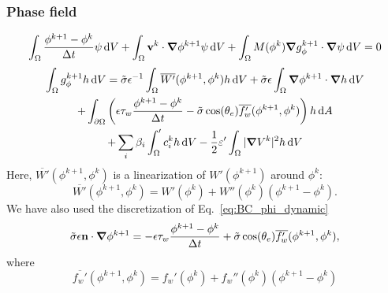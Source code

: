 \documentclass[preprint,pre,superscriptaddress,a4paper]{revtex4-1}
\renewcommand{\v}[1]{\ensuremath{\mathbf{#1}}} %
\newcommand{\gv}[1]{\ensuremath{\mbox{\boldmath$ #1 $}}}
\newcommand{\diff}{\mathrm{d}}
\newcommand{\grad}[1]{\gv{\nabla} #1} %
\begin{document}
\subsubsection{Phase field}
\begin{equation}
  \int_\Omega \frac{\phi^{k+1}-\phi^k}{\Delta t} \psi \, \diff V + \int_\Omega \v v^k \cdot \grad \phi^{k+1} \psi \, \diff V + \int_\Omega M(\phi^k) \grad g_\phi^{k+1} \cdot \grad \psi \, \diff V %
  = 0
\end{equation}
\begin{multline}
  \int_\Omega g_\phi^{k+1} h \, \diff V = \tilde\sigma\epsilon^{-1} \int_\Omega \overline{W'}(\phi^{k+1}, \phi^{k}) h \, \diff V + \tilde\sigma\epsilon \int_\Omega \grad \phi^{k+1} \cdot \grad h \, \diff V \\
  + \int_{\partial \Omega}  \left( \epsilon \tau_w \frac{\phi^{k+1}-\phi^k}{\Delta t}  - \tilde\sigma\cos(\theta_e) \overline{f_w'}(\phi^{k+1}, \phi^{k}) \right) h \, \diff A \\
  + \sum_i \beta_i \int_\Omega  ' c_i^k h \, \diff V - \frac 1 2 \varepsilon'  \int_\Omega | \grad V^k |^2 h \, \diff V
\end{multline}
Here, $\overline{W'}(\phi^{k+1}, \phi^{k})$ is a linearization of $W'(\phi^{k+1})$ around $\phi^k$:
\begin{equation}
  \overline{W'}(\phi^{k+1}, \phi^{k}) = W'(\phi^k) + W''(\phi^k) (\phi^{k+1}-\phi^k).
\end{equation}
We have also used the discretization of Eq.~\ref{eq:BC_phi_dynamic}
\begin{equation}
  \tilde\sigma\epsilon \v n \cdot \grad \phi^{k+1} = - \epsilon \tau_w \frac{\phi^{k+1}-\phi^k}{\Delta t}  + \tilde\sigma\cos(\theta_e) \overline{f_w'}(\phi^{k+1}, \phi^{k}),
\end{equation}
where
\begin{equation}
  \overline{f_w'}(\phi^{k+1}, \phi^{k}) = f_w'(\phi^k) + f_w''(\phi^k)(\phi^{k+1}-\phi^k)
\end{equation}
\end{document}
